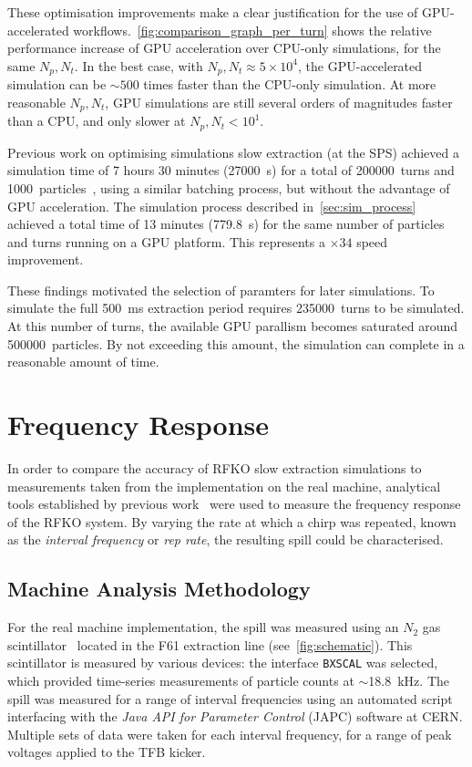 \documentclass[11pt]{report}
\begin{document}
These optimisation improvements make a clear justification for the use of GPU-accelerated workflows.~\autoref{fig:comparison_graph_per_turn} shows the relative performance increase of GPU acceleration over CPU-only simulations, for the same $N_p, N_t$. In the best case, with $N_p, N_t \approx 5\times 10^4$, the GPU-accelerated simulation can be $\sim 500$ times faster than the CPU-only simulation. At more reasonable $N_p, N_t$, GPU simulations are still several orders of magnitudes faster than a CPU, and only slower at $N_p, N_t < 10^1$.

Previous work on optimising simulations slow extraction (at the SPS) achieved a simulation time of 7 hours 30 minutes (\qty{27000}{\second}) for a total of \qty{200000}{turns} and \qty{1000}{particles}~\cite[Figure 3]{Schicho:2039579}, using a similar batching process, but without the advantage of GPU acceleration. The simulation process described in~\autoref{sec:sim_process} achieved a total time of 13 minutes (\qty{779.8}{\second}) for the same number of particles and turns running on a GPU platform. This represents a $\times 34$ speed improvement.

These findings motivated the selection of paramters for later simulations. To simulate the full \qty{500}{\milli\second} extraction period requires \qty{235000}{turns} to be simulated. At this number of turns, the available GPU parallism becomes saturated around \qty{500000}{particles}. By not exceeding this amount, the simulation can complete in a reasonable amount of time.

\newpage
\section{Frequency Response}

In order to compare the accuracy of RFKO slow extraction simulations to measurements taken from the implementation on the real machine, analytical tools established by previous work~\cite{Pari:2780495} were used to measure the frequency response of the RFKO system. By varying the rate at which a chirp was repeated, known as the \textit{interval frequency} or \textit{rep rate}, the resulting spill could be characterised. 

\subsection{Machine Analysis Methodology}\label{sec:machine_freq_anal_method}

For the real machine implementation, the spill was measured using an $N_2$ gas scintillator~\cite{Actis:bxscint} located in the F61 extraction line (see~\autoref{fig:schematic}). This scintillator is measured by various devices: the interface \verb|BXSCAL| was selected, which provided time-series measurements of particle counts at $\sim$\qty{18.8}{\kilo\hertz}. The spill was measured for a range of interval frequencies using an automated script interfacing with the \textit{Java API for Parameter Control} (JAPC) software at CERN. Multiple sets of data were taken for each interval frequency, for a range of peak voltages applied to the TFB kicker. 
\end{document}
